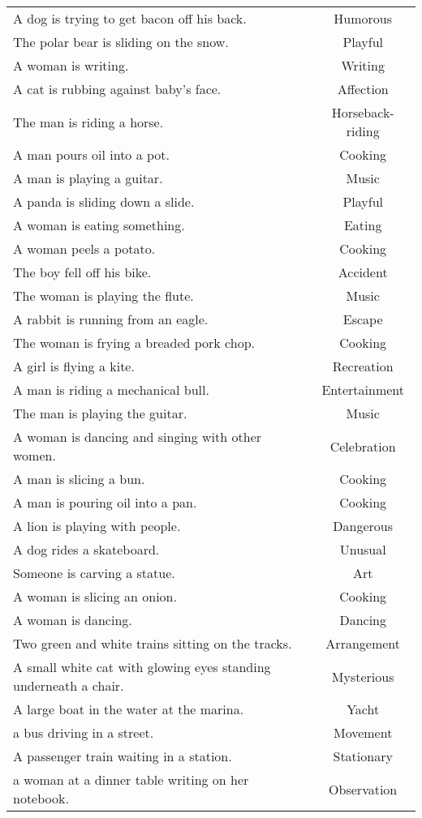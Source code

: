 \begin{longtable}{p{12cm}c}
A dog is trying to get bacon off his back. & Humorous\\
The polar bear is sliding on the snow. & Playful\\
A woman is writing. & Writing\\
A cat is rubbing against baby's face. & Affection\\
The man is riding a horse. & Horseback-riding\\
A man pours oil into a pot. & Cooking\\
A man is playing a guitar. & Music\\
A panda is sliding down a slide. & Playful\\
A woman is eating something. & Eating\\
A woman peels a potato. & Cooking\\
The boy fell off his bike. & Accident\\
The woman is playing the flute. & Music\\
A rabbit is running from an eagle. & Escape\\
The woman is frying a breaded pork chop. & Cooking\\
A girl is flying a kite. & Recreation\\
A man is riding a mechanical bull. & Entertainment\\
The man is playing the guitar. & Music\\
A woman is dancing and singing with other women. & Celebration\\
A man is slicing a bun. & Cooking\\
A man is pouring oil into a pan. & Cooking\\
A lion is playing with people. & Dangerous\\
A dog rides a skateboard. & Unusual\\
Someone is carving a statue. & Art\\
A woman is slicing an onion. & Cooking\\
A woman is dancing. & Dancing\\
Two green and white trains sitting on the tracks. & Arrangement\\
A small white cat with glowing eyes standing underneath a chair. & Mysterious\\
A large boat in the water at the marina. & Yacht\\
a bus driving in a street. & Movement\\
A passenger train waiting in a station. & Stationary\\
a woman at a dinner table writing on her notebook. & Observation\\

\end{longtable}
